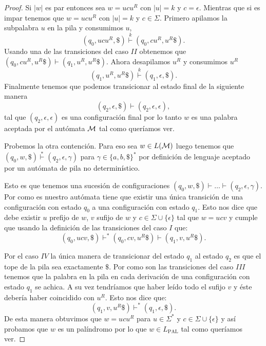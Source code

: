 \documentclass[tesis.tex]{subfiles}
\begin{document}
\begin{proof}
	Si $|w|$ es par entonces sea $w = ucu^R$ con $|u| = k$ y $c=\epsilon$.
	Mientras que si es impar tenemos que $w = ucu^R$ con $|u| = k$ y $c \in \Sigma$.
	Primero apilamos la subpalabra $u$ en la pila y consumimos $u$,
	\[
	(q_{0}, ucu^R, \$) \overset{k}{\vdash} (q_{0},cu^R,u^R\$).
	\]
	Usando una de las transiciones del caso $II$ obtenemos que 
	$(q_{0},cu^R,u^R\$) \vdash (q_{1},u^R,u^R\$)$.
	Ahora desapilamos $u^R$ y consumimos $u^R$
	\[
	(q_{1},u^R,u^R\$) \overset{k}{\vdash} (q_{1},\epsilon,\$).
	\] 
	Finalmente tenemos que podemos transicionar al estado final de la siguiente manera
	\[
		(q_{2}, \epsilon, \$) \vdash (q_{2}, \epsilon, \epsilon),
	\]
	tal que $(q_{2}, \epsilon, \epsilon)$ es una configuración final por lo tanto $w$ es una palabra aceptada por el autómata $\cal M$ tal como queríamos ver.

	Probemos la otra contención.
	Para eso sea $w \in L(\cal M)$ luego tenemos que $(q_{0},w,\$) \overset{*}{\vdash} (q_{2},\epsilon,\gamma)$ para $\gamma \in \{ a,b, \$ \}^*$ por definición de lenguaje aceptado por un autómata de pila no determinístico.
	
	Esto es que tenemos una sucesión de configuraciones $(q_{0},w,\$) \vdash \dots \vdash (q_{2},\epsilon,\gamma)$.
	Por como es nuestro autómata tiene que existir una única transición de una configuración con estado $q_{0}$ a una configuración con estado $q_{1}$.		
	Esto nos dice que debe existir $u$ prefijo de $w$, $v$ sufijo de $w$ y $c \in \Sigma \cup \{ \epsilon \}$ tal que $w = ucv$ y cumple que usando la definición de las transiciones del caso $I$ que:
	\[
		(q_{0}, ucv, \$) \vdash^{*} (q_{0}, cv, u^R \$) \vdash (q_{1}, v, u^R \$).
	\]
	
	Por el caso $IV$ la única manera de transicionar del estado $q_{1}$ al estado $q_{2}$ es que el tope de la pila sea exactamente $ \$ $. 
	Por como son las transiciones del caso $III$ tenemos que la palabra en la pila en cada derivación de una configuración con estado $q_{1}$ se achica. 
	A su vez tendríamos que haber leído todo el sufijo $v$ y éste debería haber coincidido con $u^R$. 
	Esto nos dice que: 
	\[
		(q_{1}, v, u^R\$) \vdash^* (q_{1},\epsilon, \$).
	\]
	De esta manera obtuvimos que $w = ucu^R$ para $u \in \Sigma^*$ y $c \in \Sigma \cup \{\epsilon\}$ y así probamos que $w$ es un palíndromo por lo que $w \in L_{\text{PAL}}$ tal como queríamos ver.
	
\end{proof}
\end{document}
